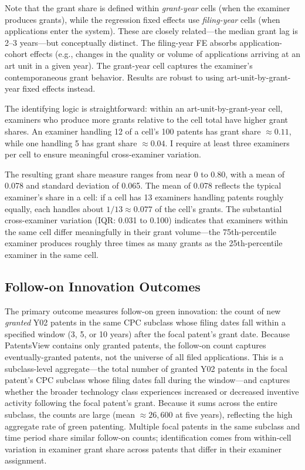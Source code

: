 \documentclass[12pt]{article}
\begin{document}
Note that the grant share is defined within \emph{grant-year} cells (when the examiner produces grants), while the regression fixed effects use \emph{filing-year} cells (when applications enter the system). These are closely related---the median grant lag is 2--3 years---but conceptually distinct. The filing-year FE absorbs application-cohort effects (e.g., changes in the quality or volume of applications arriving at an art unit in a given year). The grant-year cell captures the examiner's contemporaneous grant behavior. Results are robust to using art-unit-by-grant-year fixed effects instead.

The identifying logic is straightforward: within an art-unit-by-grant-year cell, examiners who produce more grants relative to the cell total have higher grant shares. An examiner handling 12 of a cell's 100 patents has grant share $\approx 0.11$, while one handling 5 has grant share $\approx 0.04$. I require at least three examiners per cell to ensure meaningful cross-examiner variation.

The resulting grant share measure ranges from near 0 to 0.80, with a mean of 0.078 and standard deviation of 0.065. The mean of 0.078 reflects the typical examiner's share in a cell: if a cell has 13 examiners handling patents roughly equally, each handles about $1/13 \approx 0.077$ of the cell's grants. The substantial cross-examiner variation (IQR: 0.031 to 0.100) indicates that examiners within the same cell differ meaningfully in their grant volume---the 75th-percentile examiner produces roughly three times as many grants as the 25th-percentile examiner in the same cell.

\subsection{Follow-on Innovation Outcomes}

The primary outcome measures follow-on green innovation: the count of new \emph{granted} Y02 patents in the same CPC subclass whose filing dates fall within a specified window (3, 5, or 10 years) after the focal patent's grant date. Because PatentsView contains only granted patents, the follow-on count captures eventually-granted patents, not the universe of all filed applications. This is a subclass-level aggregate---the total number of granted Y02 patents in the focal patent's CPC subclass whose filing dates fall during the window---and captures whether the broader technology class experiences increased or decreased inventive activity following the focal patent's grant. Because it sums across the entire subclass, the counts are large (mean $\approx 26{,}600$ at five years), reflecting the high aggregate rate of green patenting. Multiple focal patents in the same subclass and time period share similar follow-on counts; identification comes from within-cell variation in examiner grant share across patents that differ in their examiner assignment.
\end{document}
